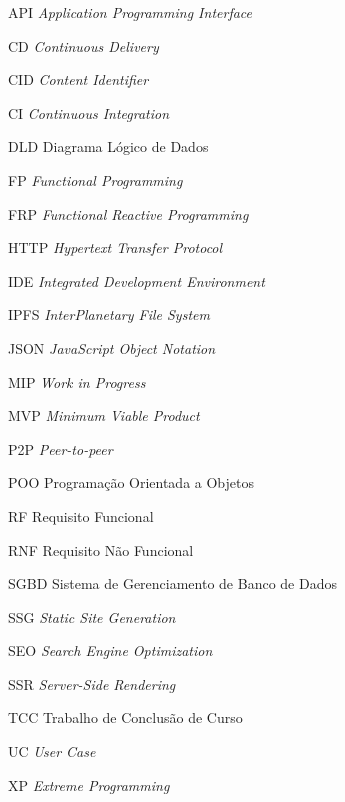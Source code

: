 \begin{siglas}
  \item[API] \textit{Application Programming Interface}
  \item[CD] \textit{Continuous Delivery}
  \item[CID] \textit{Content Identifier}
  \item[CI] \textit{Continuous Integration}
  \item[DLD] Diagrama Lógico de Dados
  \item[FP] \textit{Functional Programming} 
  \item[FRP] \textit{Functional Reactive Programming}
  \item[HTTP] \textit{Hypertext Transfer Protocol}
  \item[IDE] \textit{Integrated Development Environment}
  \item[IPFS] \textit{InterPlanetary File System}
  \item[JSON] \textit{JavaScript Object Notation}
  \item[MIP] \textit{Work in Progress}
  \item[MVP] \textit{Minimum Viable Product}
  \item[P2P] \textit{Peer-to-peer}
  \item[POO] Programação Orientada a Objetos
  \item[RF] Requisito Funcional
  \item[RNF] Requisito Não Funcional
  \item[SGBD] Sistema de Gerenciamento de Banco de Dados
  \item[SSG] \textit{Static Site Generation}
  \item[SEO] \textit{Search Engine Optimization}
  \item[SSR] \textit{Server-Side Rendering}
  \item[TCC] Trabalho de Conclusão de Curso
  \item[UC] \textit{User Case}
  \item[XP] \textit{Extreme Programming}
\end{siglas}
